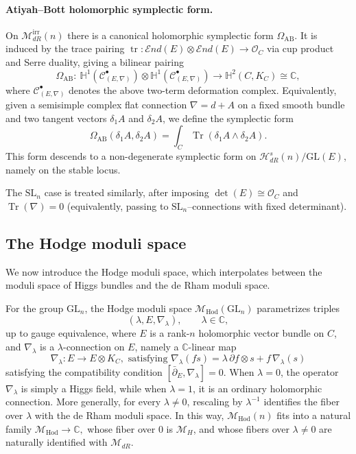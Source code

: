 \documentclass[twoside, 11pt]{article}
\numberwithin{equation}{section}
\theoremstyle{theorem}
\numberwithin{theorem}{section}
\theoremstyle{definition}
\DeclareMathOperator{\Tr}{Tr}
\newcommand{\pa}{\partial}
\begin{document}
\paragraph{Atiyah--Bott holomorphic symplectic form.}
On $\mathcal{M}_{dR}^{\mathrm{irr}}(n)$ there is a canonical holomorphic symplectic form $\Omega_{\mathrm{AB}}$. It is induced by the trace pairing $\operatorname{tr}:\mathcal{E}nd(E)\otimes\mathcal{E}nd(E)\to\mathcal{O}_C$ via cup product and Serre duality, giving a bilinear pairing
\[
\Omega_{\mathrm{AB}}:\ 
\mathbb{H}^1(\mathcal{C}^\bullet_{(E,\nabla)})\otimes \mathbb{H}^1(\mathcal{C}^\bullet_{(E,\nabla)})
\longrightarrow
\mathbb{H}^2(C,K_C)\cong \mathbb{C},
\]
where $\mathcal{C}^\bullet_{(E,\nabla)}$ denotes the above two-term deformation complex. Equivalently, given a semisimple complex flat connection $\nabla=d+A$ on a fixed smooth bundle and two tangent vectors $\delta_1 A$ and $\delta_2 A$, we define the symplectic form
\[
\Omega_{\mathrm{AB}}(\delta_1 A,\delta_2 A)=\int_C \operatorname{Tr}\!\left(\delta_1 A\wedge \delta_2 A\right).
\]
This form descends to a non-degenerate symplectic form on $\mathcal H_{dR}^{s}(n)/\mathrm{GL}(E)$, namely on the stable locus. 

\medskip
The $\mathrm{SL}_n$ case is treated similarly, after imposing $\det(E)\cong \mathcal{O}_C$ and $\Tr(\nabla)=0$ (equivalently, passing to $\mathrm{SL}_n$--connections with fixed determinant).


\subsection{The Hodge moduli space}

We now introduce the Hodge moduli space, which interpolates between the moduli space of Higgs bundles and the de Rham moduli space.

For the group \(\mathrm{GL}_n\), the Hodge moduli space \(\mathcal{M}_{\mathrm{Hod}}(\mathrm{GL}_n)\) parametrizes triples
\[
(\lambda,E,\nabla_\lambda), \qquad \lambda\in \mathbb C,
\]
up to gauge equivalence, where \(E\) is a rank-\(n\) holomorphic vector bundle on \(C\), and \(\nabla_\lambda\) is a \(\lambda\)-connection on \(E\), namely a \(\mathbb C\)-linear map
\[
\nabla_\lambda:E\to E\otimes K_C, \text{ satisfying } \nabla_\lambda(fs)=\lambda\,\partial f\otimes s+f\,\nabla_\lambda(s)
\]
satisfying the compatibility condition $[\bar\pa_E,\nabla_{\lambda}] = 0$. 
When \(\lambda=0\), the operator \(\nabla_\lambda\) is simply a Higgs field, while when \(\lambda=1\), it is an ordinary holomorphic connection. More generally, for every \(\lambda\neq 0\), rescaling by \(\lambda^{-1}\) identifies the fiber over \(\lambda\) with the de Rham moduli space. In this way, \(\mathcal{M}_{\mathrm{Hod}}(n)\) fits into a natural family
\(
\mathcal{M}_{\mathrm{Hod}}\longrightarrow \mathbb{C}, 
\)
whose fiber over \(0\) is \(\mathcal{M}_H\), and whose fibers over \(\lambda\neq 0\) are naturally identified with \(\mathcal{M}_{dR}\).
\end{document}
